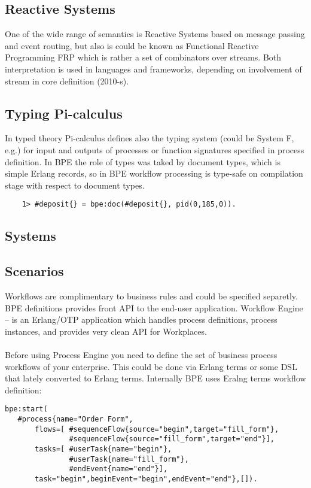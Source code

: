 \subsection{Reactive Systems}
One of the wide range of semantics is Reactive Systems based on message passing
and event routing, but also is could be known as Functional Reactive Programming FRP
which is rather a set of combinators over streams. Both interpretation is
used in languages and frameworks, depending on involvement of stream in core
definition (2010-s).

\subsection{Typing Pi-calculus}
In typed theory Pi-calculus defines also the typing system (could be System F, e.g.) for
input and outputs of processes or function signatures specified in process definition.
In BPE the role of types was taked by document types, which is simple Erlang records,
so in BPE workflow processing is type-safe on compilation stage with respect to document types.

\vspace{1\baselineskip}
\begin{lstlisting}
    1> #deposit{} = bpe:doc(#deposit{}, pid(0,185,0)).
\end{lstlisting}
\subsection{Systems}

\subsection{Scenarios}
Workflows are complimentary to business rules and could be specified separetly.
BPE definitions provides front API to the end-user application.
Workflow Engine -- is an Erlang/OTP application which handles process definitions,
process instances, and provides very clean API for Workplaces.

\paragraph{}
Before using Process Engine you need to define the set of business process
workflows of your enterprise. This could be done via Erlang terms or some DSL
that lately converted to Erlang terms. Internally BPE uses Eralng terms
workflow definition:

\vspace{1\baselineskip}
\begin{lstlisting}
bpe:start(
   #process{name="Order Form",
       flows=[ #sequenceFlow{source="begin",target="fill_form"},
               #sequenceFlow{source="fill_form",target="end"}],
       tasks=[ #userTask{name="begin"},
               #userTask{name="fill_form"},
               #endEvent{name="end"}],
       task="begin",beginEvent="begin",endEvent="end"},[]).
\end{lstlisting}


